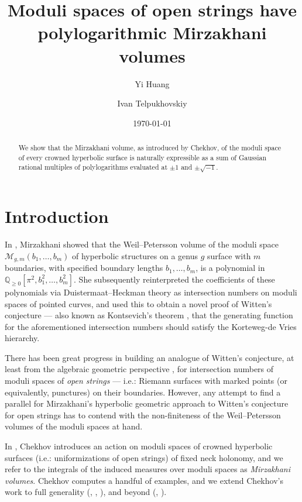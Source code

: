 \documentclass{amsart}
\title[Moduli spaces of open strings have polylog volumes]
{Moduli spaces of open strings have polylogarithmic Mirzakhani volumes}
\author{Yi Huang}
\author{Ivan Telpukhovskiy}
\date{\today}
\theoremstyle{definition}
\begin{document}
\begin{abstract}
We show that the Mirzakhani volume, as introduced by Chekhov, of the moduli space of every crowned hyperbolic surface is naturally expressible as a sum of Gaussian rational multiples of polylogarithms evaluated at $\pm1$ and $\pm\sqrt{-1}$.
\end{abstract}
\maketitle






\section{Introduction}

In \cite{mirz_simp}, Mirzakhani showed that the Weil--Petersson volume of the moduli space $\mathcal{M}_{g,m}(b_1,\ldots,b_m)$ of hyperbolic structures on a genus $g$ surface with $m$  boundaries, with specified boundary lengths $b_1,\ldots,b_m$, is a polynomial in $\mathbb{Q}_{\geqslant 0}[\pi^2,b_1^2,\ldots,b_m^2]$. She subsequently reinterpreted the coefficients of these polynomials via Duistermaat--Heckman theory as intersection numbers on moduli spaces of pointed curves, and used this to obtain a novel proof of Witten's conjecture \cite{witten_conjecture} --- also known as Kontsevich's theorem \cite{MR1171758}, that the generating function for the aforementioned intersection numbers should satisfy the Korteweg-de Vries hierarchy.\medskip

There has been great progress in building an analogue of Witten's conjecture, at least from the algebraic geometric perspective \cite{zbMATH06877694,  zbMATH06824078, zbMATH07023773, zbMATH06576752, zbMATH06497098, buryak2017matrix, zbMATH07951658}, for intersection numbers of moduli spaces of \emph{open strings} --- i.e.: Riemann surfaces with marked points (or equivalently, punctures) on their boundaries. However, any attempt to find a parallel for Mirzakhani's hyperbolic geometric approach to Witten's conjecture for open strings has to contend with the non-finiteness of the Weil--Petersson volumes of the moduli spaces at hand.\medskip


In \cite{chekhov2024}, Chekhov introduces an action on moduli spaces of crowned hyperbolic surfaces (i.e.: uniformizations of open strings) of fixed neck holonomy, and we refer to the integrals of the induced measures over moduli spaces as \emph{Mirzakhani volumes}. Chekhov computes a handful of examples, and we extend Chekhov's work to full generality (, , ), and beyond (, ).
\end{document}
